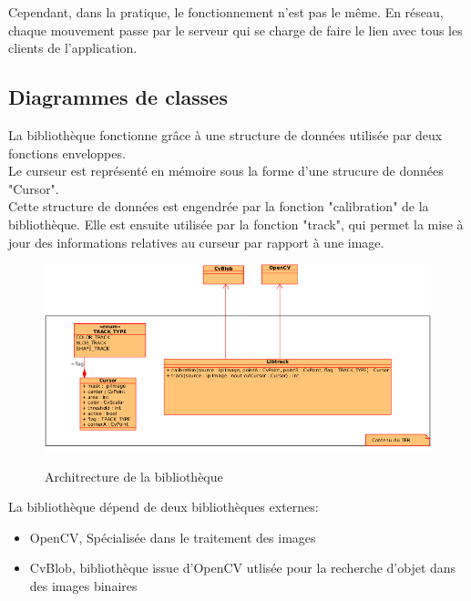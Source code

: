 \documentclass{report}
\begin{document}
				Cependant, dans la pratique, le fonctionnement n'est pas le même. En réseau, chaque mouvement passe par le serveur qui se charge de faire le lien avec tous les clients de l'application.

			\newpage
			\subsection{Diagrammes de classes}
				La bibliothèque fonctionne grâce à une structure de données utilisée par deux fonctions enveloppes. \\
				Le curseur est représenté en mémoire sous la forme d'une strucure de données "Cursor". \\
				Cette structure de données est engendrée par la fonction "calibration" de la bibliothèque. Elle est ensuite utilisée par la fonction "track", qui permet la mise à jour des informations relatives au curseur par rapport à une image. \\
				\begin{figure}[!h]
						\centering
						\includegraphics[scale=0.8]{../images/libtrack-uml.png}\\
						\caption{Architrecture de la bibliothèque}
						\label{Architrecture de la bibliothèque}
				\end{figure}

				La bibliothèque dépend de deux bibliothèques externes:
				\begin{itemize}
					\item OpenCV, Spécialisée dans le traitement des images
					\item CvBlob, bibliothèque issue d'OpenCV utlisée pour la recherche d'objet dans des images binaires
				\end{itemize}
\end{document}
